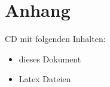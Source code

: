 \cleardoublepage 
{}
\chapter*{Anhang}
CD mit folgenden Inhalten:
\begin{itemize}
	\item dieses Dokument
	\item Latex Dateien
\end{itemize}